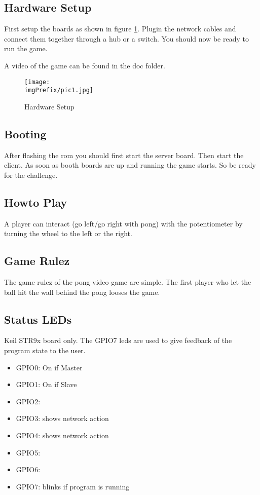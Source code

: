 \subsection{Hardware Setup}
First setup the boards as shown in figure \ref{fig_board_setup}.
Plugin the network cables and connect them together through a hub or a switch. 
You should now be ready to run the game. 

A video of the game can be found in the doc folder. 
\begin{figure}[h!]%
	\centering
	\texttt{[image: \\imgPrefix/pic1.jpg]}
	\caption{Hardware Setup}
	\label{fig_board_setup}
\end{figure}

\subsection{Booting}
After flashing the rom you should first start the server board. Then start the
client. As soon as booth boards are up and running the game starts. So be
ready for the challenge.

\subsection{Howto Play}
A player can interact (go left/go right with pong) with the potentiometer by
turning the wheel to the left or the right. 

\subsection{Game Rulez}
The game rulez of the pong video game are simple. The first player who let the
ball hit the wall behind the pong looses the game. 

\subsection{Status LEDs}
Keil STR9x board only. The GPIO7 leds are used to give feedback of the program
state to the user. 
\begin{itemize}
  \item GPIO0: On if Master
  \item GPIO1: On if Slave
  \item GPIO2:
  \item GPIO3: shows network action
  \item GPIO4: shows network action
  \item GPIO5:
  \item GPIO6:
  \item GPIO7: blinks if program is running
\end{itemize}

